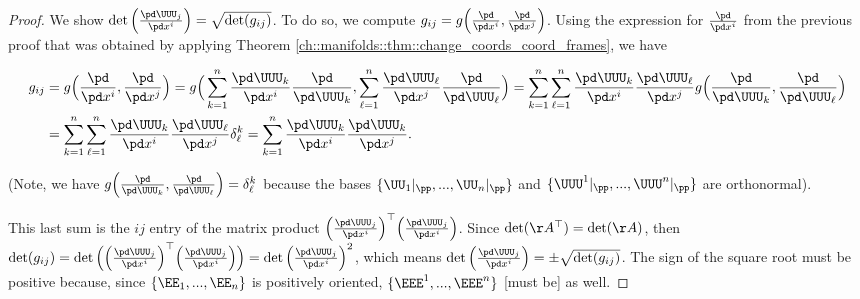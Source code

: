 \begin{proof}
    We show $\det \Big( \frac{\pd \UUU_j}{\pd x^i} \Big) = \sqrt{\det(g_{ij})}$. To do so, we compute $g_{ij} = g\Big( \frac{\pd}{\pd x^i}, \frac{\pd}{\pd x^j} \Big)$. Using the expression for $\frac{\pd}{\pd x^i}$ from the previous proof that was obtained by applying Theorem \ref{ch::manifolds::thm::change_coords_coord_frames}, we have
    
    \begin{align*}
        g_{ij} &= g\Big( \frac{\pd}{\pd x^i}, \frac{\pd}{\pd x^j} \Big)
        = g\Big( \sum_{k = 1}^n \frac{\pd \UUU_k}{\pd x^i} \frac{\pd}{\pd \UUU_k}, \sum_{\ell = 1}^n \frac{\pd \UUU_\ell}{\pd x^j} \frac{\pd}{\pd \UUU_\ell} \Big)
        = \sum_{k = 1}^n \sum_{\ell = 1}^n \frac{\pd \UUU_k}{\pd x^i} \frac{\pd \UUU_\ell}{\pd x^j} g\Big( \frac{\pd}{\pd \UUU_k}, \frac{\pd}{\pd \UUU_\ell} \Big) \\
        &= \sum_{k = 1}^n \sum_{\ell = 1}^n \frac{\pd \UUU_k}{\pd x^i} \frac{\pd \UUU_\ell}{\pd x^j} \delta^k_\ell
        = \sum_{k = 1}^n \frac{\pd \UUU_k}{\pd x^i} \frac{\pd \UUU_k}{\pd x^j}.
    \end{align*}
    
    (Note, we have $g\Big( \frac{\pd}{\pd \UUU_k}, \frac{\pd}{\pd \UUU_\ell} \Big) = \delta^k_\ell$ because the bases $\{\UU_1|_\pp, ..., \UU_n|_\pp\}$ and $\{\UUU^1|_\pp, ..., \UUU^n|_\pp\}$ are orthonormal).
    
    This last sum is the $ij$ entry of the matrix product $\Big( \frac{\pd \UUU_j}{\pd x^i} \Big)^\top \Big( \frac{\pd \UUU_j}{\pd x^i} \Big)$. Since $\det(\AA^\top) = \det(\AA)$, then $\det(g_{ij}) = \det \Big( \Big( \frac{\pd \UUU_j}{\pd x^i} \Big)^\top \Big( \frac{\pd \UUU_j}{\pd x^i} \Big) \Big) = \det\Big( \frac{\pd \UUU_j}{\pd x^i} \Big)^2$, which means $\det\Big( \frac{\pd \UUU_j}{\pd x^i} \Big) = \pm \sqrt{\det(g_{ij})}$. The sign of the square root must be positive because, since $\{\EE_1, ..., \EE_n\}$ is positively oriented, $\{\EEE^1, ..., \EEE^n\}$ [must be] as well.
\end{proof}